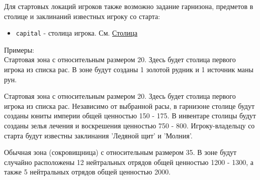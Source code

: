 Для стартовых локаций игроков также возможно задание гарнизона, предметов в столице и заклинаний известных игроку со старта:
\begin{itemize}
\item \texttt{capital} - столица игрока. См. \hyperref[capital]{Столица}
\end{itemize}

Примеры:\\
Стартовая зона с относительным размером 20. Здесь будет столица первого игрока из списка рас.
В зоне будут созданы 1 золотой рудник и 1 источник маны рун.

\begin{figure}[H]

\end{figure}

Стартовая зона с относительным размером 20. Здесь будет столица первого игрока из списка рас.
Независимо от выбранной расы, в гарнизоне столице будут созданы юниты империи общей ценностью 150 - 175.
В инвентаре столицы будут созданы зелья лечения и воскрешения ценностью 750 - 800.
Игроку-владельцу со старта будут известны заклинания 'Ледяной щит' и 'Молния'.

\begin{figure}[H]

\end{figure}

Обычная зона (сокровищница) с относительным размером 35.
В зоне будут случайно расположены 12 нейтральных отрядов общей ценностью 1200 - 1300,
а также 5 нейтральных отрядов общей ценностью 2000.

\begin{figure}[H]

\end{figure}